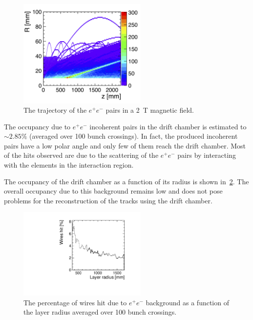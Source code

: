 \documentclass[conference]{IEEEtran}
\begin{document}
\begin{figure}[!t]
\centering
\includegraphics[width=2.5in]{figures/pairs_R_Z.png}
\caption{The trajectory of the $e^+e^-$ pairs in a 2~T magnetic field.}
\label{fig_pairbcg}
\end{figure}

The occupancy due to $e^+e^-$ incoherent pairs in the drift chamber is estimated to $\sim2.85\%$ (averaged over 100 bunch crossings). In fact, the produced incoherent pairs have a low polar angle and only few of them reach the drift chamber. Most of the hits observed are due to the scattering of the $e^+e^-$ pairs by interacting with the elements in the interaction region.


The occupancy of the drift chamber as a function of its radius is shown in~\cref{fig_simhitspercent}. The overall occupancy due to this background remains low and does not pose problems for the reconstruction of the tracks using the drift chamber.

\begin{figure}[!t]
\centering
\includegraphics[width=2.5in]{figures/layerR_vs_wires_percent}
\caption{The percentage of wires hit due to $e^+e^-$ background as a function of the layer radius averaged over 100 bunch crossings.}
\label{fig_simhitspercent}
\end{figure}
\end{document}

